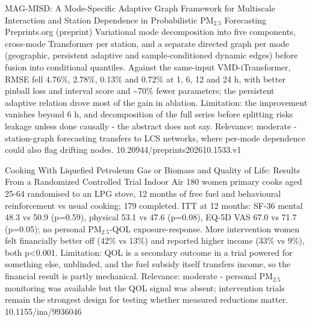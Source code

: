 \documentclass[10pt]{article}
\begin{document}
{MAG-MISD: A Mode-Specific Adaptive Graph Framework for Multiscale Interaction and Station Dependence in Probabilistic PM$_{2.5}$ Forecasting}
{Preprints.org (preprint)}
{Variational mode decomposition into five components, cross-mode Transformer per station, and a separate directed graph per mode (geographic, persistent adaptive and sample-conditioned dynamic edges) before fusion into conditional quantiles. Against the same-input VMD-iTransformer, RMSE fell 4.76\%, 2.78\%, 0.13\% and 0.72\% at 1, 6, 12 and 24 h, with better pinball loss and interval score and \textasciitilde{}70\% fewer parameters; the persistent adaptive relation drove most of the gain in ablation. Limitation: the improvement vanishes beyond 6 h, and decomposition of the full series before splitting risks leakage unless done causally - the abstract does not say. Relevance: moderate - station-graph forecasting transfers to LCS networks, where per-mode dependence could also flag drifting nodes.}
{10.20944/preprints202610.1533.v1}

\par{}\baselineskip{}\baselineskip
{}

{Cooking With Liquefied Petroleum Gas or Biomass and Quality of Life: Results From a Randomized Controlled Trial}
{Indoor Air}
{180 women primary cooks aged 25-64 randomised to an LPG stove, 12 months of free fuel and behavioural reinforcement vs usual cooking; 179 completed. ITT at 12 months: SF-36 mental 48.3 vs 50.9 (p=0.59), physical 53.1 vs 47.6 (p=0.08), EQ-5D VAS 67.0 vs 71.7 (p=0.05); no personal PM$_{2.5}$-QOL exposure-response. More intervention women felt financially better off (42\% vs 13\%) and reported higher income (33\% vs 9\%), both p<0.001. Limitation: QOL is a secondary outcome in a trial powered for something else, unblinded, and the fuel subsidy itself transfers income, so the financial result is partly mechanical. Relevance: moderate - personal PM$_{2.5}$ monitoring was available but the QOL signal was absent; intervention trials remain the strongest design for testing whether measured reductions matter.}
{10.1155/ina/9936046}

\par{}\baselineskip{}\baselineskip
{}
\end{document}
